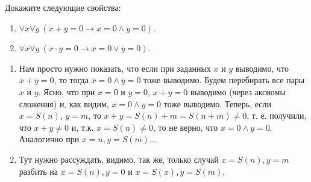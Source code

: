 \begin{task}[4]
	Докажите следующие свойства:
	\begin{enumerate}
		\item $\forall x \forall y\ (x + y = 0 \to x = 0 \land y = 0)$.
		\item $\forall x \forall y\ (x \cdot y = 0 \to x = 0 \lor y = 0)$.
	\end{enumerate}
\end{task}
\begin{solution}
\begin{enumerate}
	\item Нам просто нужно показать, что если при заданных $x$ и $y$ выводимо, что $x + y = 0$, то 
	тогда $x = 0 \land y = 0$ тоже выводимо. Будем перебирать все пары $x$ и $y$. Ясно, что при $x = 0$ и $y = 0$, $x + y = 0$ выводимо (через аксиомы сложения) и, как видим, $x = 0 \land y = 0$ тоже выводимо. Теперь, если $x = S(n)$, $y = m$, то $x + y = S(n) + m = S(n + m) \neq 0$, т. е. получили, что $x + y \neq 0$ и, т.к. $x = S(n) \neq 0$, то не верно, что $x = 0 \land y = 0$. Аналогично при $x = n, y = S(m)$...
	\item Тут нужно рассуждать, видимо, так же, только случай $x = S(n), y = m$ разбить на $x = S(n), y = 0$ и $x = S(x), y = S(m)$. 
\end{enumerate}
\xqed
\end{solution}

